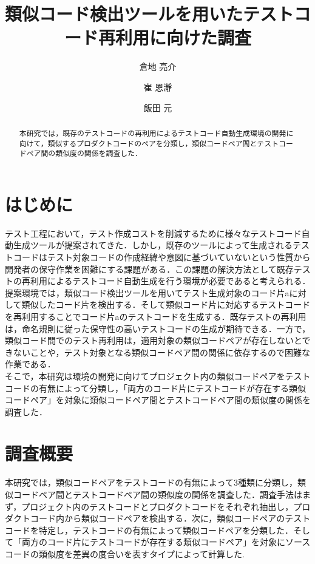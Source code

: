 \documentclass{fose2019}           %
\title{類似コード検出ツールを用いたテストコード再利用に向けた調査}
\author{倉地 亮介}{Ryosuke Kurachi, 奈良先端科学技術大学院大学}
\author{崔 恩瀞}{Eunjong Choi, 京都工芸繊維大学}
\author{飯田 元}{Hajimu Iida, 奈良先端科学技術大学院大学}
\begin{document}
\maketitle


\begin{abstract}
本研究では，既存のテストコードの再利用によるテストコード自動生成環境の開発に向けて，類似するプロダクトコードのペアを分類し，類似コードペア間とテストコードペア間の類似度の関係を調査した．
\end{abstract}

\section{はじめに}
テスト工程において，テスト作成コストを削減するために様々なテストコード自動生成ツールが提案されてきた．しかし，既存のツールによって生成されるテストコードはテスト対象コードの作成経緯や意図に基づいていないという性質から開発者の保守作業を困難にする課題がある\cite{ICST}．この課題の解決方法として既存テストの再利用によるテストコード自動生成を行う環境が必要であると考えられる．
\\\indent 提案環境では，類似コード検出ツール\cite{ICPC}を用いてテスト生成対象のコード片aに対して類似したコード片を検出する．そして類似コード片に対応するテストコードを再利用することでコード片aのテストコードを生成する．既存テストの再利用は，命名規則に従った保守性の高いテストコードの生成が期待できる．一方で，類似コード間でのテスト再利用は，適用対象の類似コードペアが存在しないとできないことや，テスト対象となる類似コードペア間の関係に依存するので困難な作業である．
\\\indent そこで，本研究は環境の開発に向けてプロジェクト内の類似コードペアをテストコードの有無によって分類し，「両方のコード片にテストコードが存在する類似コードペア」を対象に類似コードペア間とテストコードペア間の類似度の関係を調査した．

\section{調査概要}
本研究では，類似コードペアをテストコードの有無によって3種類に分類し，類似コードペア間とテストコードペア間の類似度の関係を調査した．調査手法はまず，プロジェクト内のテストコードとプロダクトコードをそれぞれ抽出し，プロダクトコード内から類似コードペアを検出する．次に，類似コードペアのテストコードを特定し，テストコードの有無によって類似コードペアを分類した．そして「両方のコード片にテストコードが存在する類似コードペア」を対象にソースコードの類似度を差異の度合いを表すタイプ\cite{SCP}によって計算した.
\end{document}
